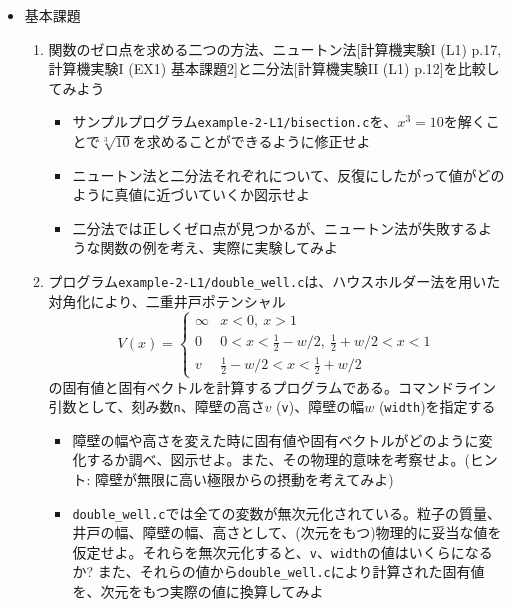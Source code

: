 \documentclass[11pt]{jarticle}
\begin{document}
\begin{itemize}
\item 基本課題
  \begin{enumerate}
  \item 関数のゼロ点を求める二つの方法、ニュートン法[計算機実験I (L1) p.17, 計算機実験I (EX1) 基本課題2]と二分法[計算機実験II (L1) p.12]を比較してみよう
    \begin{itemize}
    \item サンプルプログラム{\tt example-2-L1/bisection.c}を、$x^3=10$を解くことで$\sqrt[3]{10}$を求めることができるように修正せよ
    \item ニュートン法と二分法それぞれについて、反復にしたがって値がどのように真値に近づいていくか図示せよ
    \item 二分法では正しくゼロ点が見つかるが、ニュートン法が失敗するような関数の例を考え、実際に実験してみよ
    \end{itemize}
  \item プログラム{\tt example-2-L1/double\_well.c}は、ハウスホルダー法を用いた対角化により、二重井戸ポテンシャル
    \begin{equation*}
      V(x) = \begin{cases}
        \infty & x < 0, \ x > 1 \\
        0 & 0 < x < \frac{1}{2} - w/2, \ \frac{1}{2} + w/2 < x < 1 \\
        v & \frac{1}{2} - w/2 < x < \frac{1}{2} + w/2
      \end{cases}
    \end{equation*}
    の固有値と固有ベクトルを計算するプログラムである。コマンドライン引数として、刻み数{\tt n}、障壁の高さ$v$ ({\tt v})、障壁の幅$w$ ({\tt width})を指定する
    \begin{itemize}
      \item 障壁の幅や高さを変えた時に固有値や固有ベクトルがどのように変化するか調べ、図示せよ。また、その物理的意味を考察せよ。(ヒント: 障壁が無限に高い極限からの摂動を考えてみよ)
      \item {\tt double\_well.c}では全ての変数が無次元化されている。粒子の質量、井戸の幅、障壁の幅、高さとして、(次元をもつ)物理的に妥当な値を仮定せよ。それらを無次元化すると、{\tt v}、{\tt width}の値はいくらになるか? また、それらの値から{\tt double\_well.c}により計算された固有値を、次元をもつ実際の値に換算してみよ

\end{itemize}
\end{enumerate}
\end{itemize}
\end{document}
